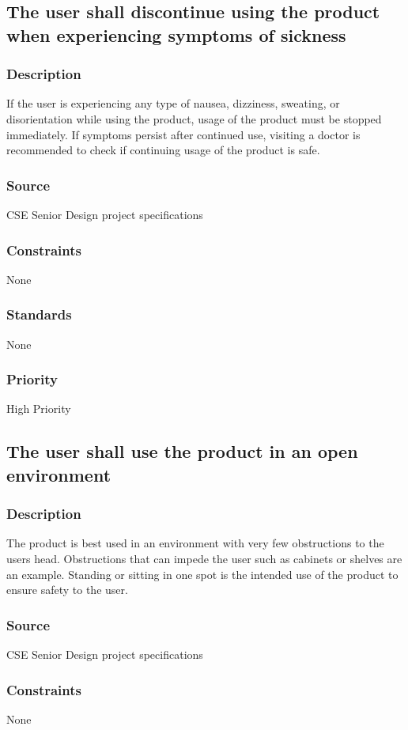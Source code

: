 
\subsection{The user shall discontinue using the product when experiencing symptoms of sickness}
\subsubsection{Description}
If the user is experiencing any type of nausea, dizziness, sweating, or disorientation while using the product, usage of the product must be stopped immediately. If symptoms persist after continued use, visiting a doctor is recommended to check if continuing usage of the product is safe.
\subsubsection{Source}
CSE Senior Design project specifications
\subsubsection{Constraints}
None
\subsubsection{Standards}
None
\subsubsection{Priority}
High Priority

\subsection{The user shall use the product in an open environment}
\subsubsection{Description}
The product is best used in an environment with very few obstructions to the users head. Obstructions that can impede the user such as cabinets or shelves are an example. Standing or sitting in one spot is the intended use of the product to ensure safety to the user.
\subsubsection{Source}
CSE Senior Design project specifications
\subsubsection{Constraints}
None
